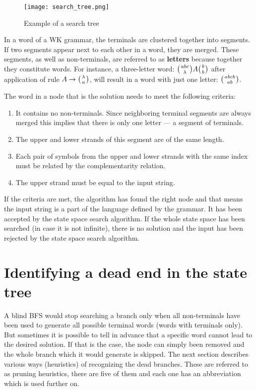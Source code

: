 \begin{figure}[h]
  \centering
  \texttt{[image: search\_tree.png]}
  \caption{Example of a search tree}
  \label{fig:search_tree}
\end{figure}

In a word of a WK grammar, the terminals are clustered together into segments. If two segments appear next to each other in a word, they are merged. These segments, as well as non-terminals, are referred to as \textbf{letters} because together they constitute words. For instance, a three-letter word: $\wkpair{abc}{\lambda} A \wkpair{b}{b}$ after application of rule $A \rightarrow \wkpair{\lambda}{a}$, will result in a word with just one letter: $\wkpair{abcb}{ab}$.

The word in a node that is the solution needs to meet the following criteria:
\begin{enumerate}
  \item{It contains no non-terminals. Since neighboring terminal segments are always merged this implies that there is only one letter --- a segment of terminals.}

  \item{The upper and lower strands of this segment are of the same length.}

  \item{Each pair of symbols from the upper and lower strands with the same index must be related by the complementarity relation.}

  \item{The upper strand must be equal to the input string.}
\end{enumerate}
If the criteria are met, the algorithm has found the right node and that means the input string is a part of the language defined by the grammar. It has been accepted by the state space search algorithm. If the whole state space has been searched (in case it is not infinite), there is no solution and the input has been rejected by the state space search algorithm.


\section{Identifying a dead end in the state tree}
A blind BFS would stop searching a branch only when all non-terminals have been used to generate all possible terminal words (words with terminals only). But sometimes it is possible to tell in advance that a specific word cannot lead to the desired solution. If that is the case, the node can simply been removed and the whole branch which it would generate is skipped. The next section describes various ways (heuristics) of recognizing the dead branches. These are referred to as pruning heuristics, there are five of them and each one has an abbreviation which is used further on.

